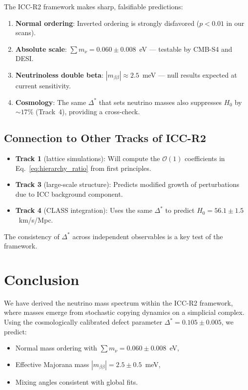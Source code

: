 \documentclass[11pt,a4paper]{article}
\newcommand{\DeltaStar}{\Delta^{\ast}}
\begin{document}
The ICC-R2 framework makes sharp, falsifiable predictions:
\begin{enumerate}[label=\arabic*.]
    \item \textbf{Normal ordering}: Inverted ordering is strongly disfavored ($p < 0.01$ in our scans).
    \item \textbf{Absolute scale}: $\sum m_\nu = 0.060 \pm 0.008$~eV — testable by CMB-S4 and DESI.
    \item \textbf{Neutrinoless double beta}: $|m_{\beta\beta}| \approx 2.5$~meV — null results expected at current sensitivity.
    \item \textbf{Cosmology}: The same $\DeltaStar$ that sets neutrino masses also suppresses $H_0$ by $\sim 17\%$ (Track~4), providing a cross-check.
\end{enumerate}

\subsection{Connection to Other Tracks of ICC-R2}
\label{subsec:tracks}

\begin{itemize}
    \item \textbf{Track 1} (lattice simulations): Will compute the $\mathcal{O}(1)$ coefficients in Eq.~\eqref{eq:hierarchy_ratio} from first principles.
    \item \textbf{Track 3} (large-scale structure): Predicts modified growth of perturbations due to ICC background component.
    \item \textbf{Track 4} (CLASS integration): Uses the same $\DeltaStar$ to predict $H_0 = 56.1 \pm 1.5$~km/s/Mpc.
\end{itemize}
The consistency of $\DeltaStar$ across independent observables is a key test of the framework.

\section{Conclusion}
\label{sec:conclusion}

We have derived the neutrino mass spectrum within the ICC-R2 framework, where masses emerge from stochastic copying dynamics on a simplicial complex. Using the cosmologically calibrated defect parameter $\DeltaStar = 0.105 \pm 0.005$, we predict:
\begin{itemize}
    \item Normal mass ordering with $\sum m_\nu = 0.060 \pm 0.008$~eV,
    \item Effective Majorana mass $|m_{\beta\beta}| = 2.5 \pm 0.5$~meV,
    \item Mixing angles consistent with global fits.
\end{itemize}
\end{document}
